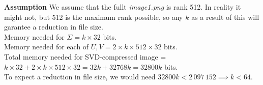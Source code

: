 \documentclass[10pt,addpoints]{exam} %
\begin{document}
\begin{questions}
\begin{parts}
{      \textbf{Assumption} We assume that the fullt \textit{image1.png} is rank 512. In reality it might not, but 512 is the maximum rank possible, so any $k$ as a result of this will garantee a reduction in file size.\\
          
      Memory needed for $\Sigma = k \times 32$ bits.\\
      Memory needed for each of $U, V = 2 \times k \times 512 \times 32$ bits.\\
      Total memory needed for SVD-compressed image = $k \times 32 + 2 \times  k \times 512 \times 32 = 32k + 32768k = 32800k$ bits.\\

      To expect a reduction in file size, we would need $32800k < 2\,097\,152 \implies k < 64$.


    }
    
  \end{parts}
  
\end{questions}
\end{document}
